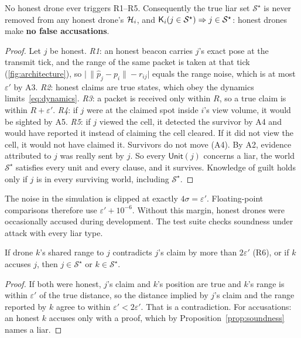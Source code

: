 \begin{proposition}
\label{prop:soundness}
No honest drone ever triggers R1--R5. Consequently the true liar set $\mathcal{S}^\star$ is never removed from any
honest drone's $\mathcal{H}_i$, and $\mathsf{K}_i(j\in\mathcal{S}^\star)\Rightarrow j\in\mathcal{S}^\star$: honest drones make
\textbf{no false accusations}.
\end{proposition}
\begin{proof}
Let $j$ be honest. \emph{R1}: an honest beacon carries $j$'s exact pose at the transmit tick, and the range of the
same packet is taken at that tick (\autoref{fig:architecture}), so $\big|\,\|\hat p_j-p_i\|-r_{ij}\big|$ equals the
range noise, which is at most $\varepsilon'$ by A3. \emph{R2}: honest claims are true states, which obey the dynamics
limits~\eqref{eq:dynamics}. \emph{R3}: a packet is received only within $R$, so a true claim is within $R+\varepsilon'$.
\emph{R4}: if $j$ were at the claimed spot inside $i$'s view volume, it would be sighted by A5. \emph{R5}: if $j$ viewed
the cell, it detected the survivor by A4 and would have reported it instead of claiming the cell cleared. If it did not
view the cell, it would not have claimed it. Survivors do not move (A4). By A2, evidence attributed to $j$ was really
sent by $j$. So every $\mathsf{Unit}(j)$ concerns a liar, the world $\mathcal{S}^\star$ satisfies every unit and every
clause, and it survives. Knowledge of guilt holds only if $j$ is in every surviving world, including
$\mathcal{S}^\star$.
\end{proof}

\begin{remark}
The noise in the simulation is clipped at exactly $4\sigma=\varepsilon'$. Floating-point comparisons therefore use
$\varepsilon'+10^{-6}$. Without this margin, honest drones were occasionally accused during development. The test
suite checks soundness under attack with every liar type.
\end{remark}

\begin{proposition}[Clauses]
\label{prop:clause}
If drone $k$'s shared range to $j$ contradicts $j$'s claim by more than $2\varepsilon'$ (R6), or if $k$ accuses $j$,
then $j\in\mathcal{S}^\star$ or $k\in\mathcal{S}^\star$.
\end{proposition}
\begin{proof}
If both were honest, $j$'s claim and $k$'s position are true and $k$'s range is within $\varepsilon'$ of the true
distance, so the distance implied by $j$'s claim and the range reported by $k$ agree to within
$\varepsilon'<2\varepsilon'$. That is a contradiction. For accusations: an honest $k$ accuses only with a proof, which by Proposition~\ref{prop:soundness} names a
liar.
\end{proof}

